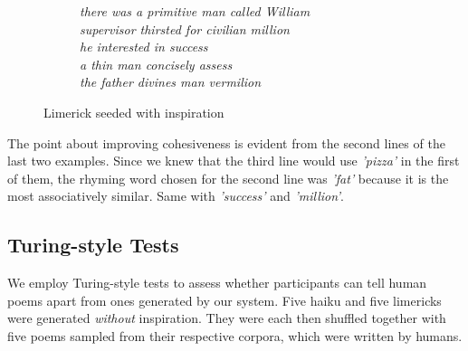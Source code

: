 \begin{figure}[H]
\centering
\begin{subfigure}[t!]{0.4\textwidth}
	\centering
\end{subfigure}
\begin{subfigure}[t!]{0.5\textwidth}
	\centering
    \textit{there was a primitive man called William\\supervisor thirsted for civilian million\\he interested in success\\a thin man concisely assess\\the father divines man vermilion}
\end{subfigure}
\caption{Limerick seeded with inspiration}
\label{fig:inspr-lim4}
\end{figure}

The point about improving cohesiveness is evident from the second lines of the last two examples. Since we knew that the third line would use \textit{'pizza'} in the first of them, the rhyming word chosen for the second line was \textit{'fat'} because it is the most associatively similar. Same with \textit{'success'} and \textit{'million'}.

\subsection{Turing-style Tests}
We employ Turing-style tests to assess whether participants can tell human poems apart from ones generated by our system. Five haiku and five limericks were generated \textit{without} inspiration. They were each then shuffled together with five poems sampled from their respective corpora, which were written by humans. 

